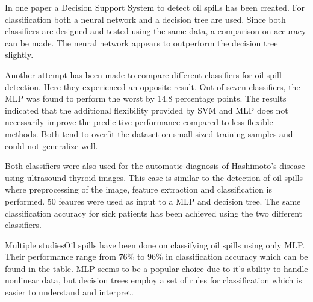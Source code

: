 In one paper a Decision Support System to detect oil spills has been created. For classification both a neural network and a decision tree are used. Since both classifiers are designed and tested using the same data, a comparison on accuracy can be made. The neural network appears to outperform the decision tree slightly. \cite{Mera201472}
	
Another attempt has been made to compare different classifiers for oil spill detection.\cite{Xu201414} Here they experienced an opposite result. Out of seven classifiers, the MLP was found to perform the worst by 14.8 percentage points. The results indicated that the additional flexibility provided by SVM and MLP does not necessarily improve the predicitive performance compared to less flexible methods. Both tend to overfit the dataset on small-sized training samples and could not generalize well.
	
Both classifiers were also used for the automatic diagnosis of Hashimoto's disease using ultrasound thyroid images\cite{Omiotek201340}. This case is similar to the detection of oil spills where preprocessing of the image, feature extraction and classification is performed. 50 feaures were used as input to a MLP and decision tree. The same classification accuracy for sick patients has been achieved using the two different classifiers.

Multiple studies\cite{Topouzelis200762}\cite{Delfrate200038}\cite{Topouzelis200930}\cite{Topouzelis200924}Oil spills\cite{Delfrate2004} have been done on classifying oil spills using only MLP. Their performance range from $76$\% to $96$\% in classification accuracy which can be found in the table. MLP seems to be a popular choice due to it's ability to handle nonlinear data, but decision trees employ a set of rules for classification which is easier to understand and interpret.






	